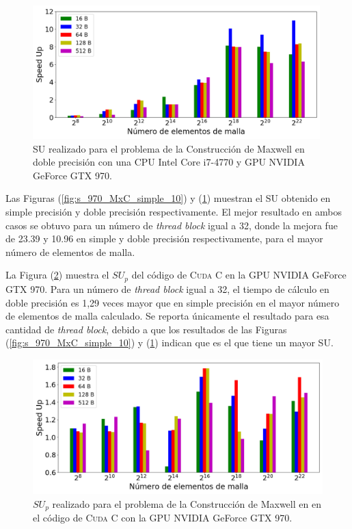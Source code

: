 \begin{figure}[htbp]
	\centering
	\includegraphics[width=0.99\textwidth]{figs_2/cap4/s_970_MxC_double_10}
	\caption{SU realizado para el problema de la Construcción de Maxwell en doble precisión con una CPU Intel Core i7-4770 y GPU NVIDIA GeForce GTX 970.} 
	\label{fig:s_970_MxC_double_10}	
\end{figure}

\newpage

Las Figuras (\ref{fig:s_970_MxC_simple_10}) y (\ref{fig:s_970_MxC_double_10}) muestran el SU obtenido en simple precisión y doble precisión respectivamente. El mejor resultado en ambos casos se obtuvo para un número de \textit{thread block} igual a 32, donde la mejora fue de 23.39 y 10.96 en simple y doble precisión respectivamente, para el mayor número de elementos de malla.

La Figura (\ref{fig:c_970_MxC_cuda_10}) muestra el ${SU}_p$ del código de \textsc{Cuda C} en la GPU NVIDIA GeForce GTX 970. Para un número de \textit{thread block} igual a 32, el tiempo de cálculo en doble precisión es 1,29 veces mayor que en simple precisión en el mayor número de elementos de malla calculado. Se reporta únicamente el resultado para esa cantidad de \textit{thread block}, debido a que los resultados de las Figuras (\ref{fig:s_970_MxC_simple_10}) y (\ref{fig:s_970_MxC_double_10}) indican que es el que tiene un mayor SU.

\begin{figure}[htbp]
	\centering
	\includegraphics[width=\textwidth]{figs_2/cap4/c_970_MxC_cuda_10}
	\caption{$SU_p$ realizado para el problema de la Construcción de Maxwell en en el código de \textsc{Cuda C} con la GPU NVIDIA GeForce GTX 970.} 
	\label{fig:c_970_MxC_cuda_10}	
\end{figure}




